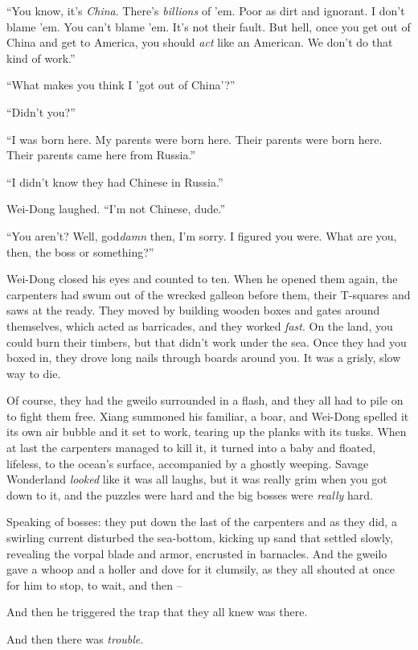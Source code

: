 ``You know, it's \emph{China}. There's \emph{billions} of 'em. Poor
as dirt and ignorant. I don't blame 'em. You can't blame 'em. It's
not their fault. But hell, once you get out of China and get to
America, you should \emph{act} like an American. We don't do that
kind of work.''

``What makes you think I 'got out of China'?''

``Didn't you?''

``I was born here. My parents were born here. Their parents were
born here. Their parents came here from Russia.''

``I didn't know they had Chinese in Russia.''

Wei-Dong laughed. ``I'm not Chinese, dude.''

``You aren't? Well, god\emph{damn} then, I'm sorry. I figured you
were. What are you, then, the boss or something?''

Wei-Dong closed his eyes and counted to ten. When he opened them
again, the carpenters had swum out of the wrecked galleon before
them, their T-squares and saws at the ready. They moved by building
wooden boxes and gates around themselves, which acted as
barricades, and they worked \emph{fast}. On the land, you could
burn their timbers, but that didn't work under the sea. Once they
had you boxed in, they drove long nails through boards around you.
It was a grisly, slow way to die.

Of course, they had the gweilo surrounded in a flash, and they all
had to pile on to fight them free. Xiang summoned his familiar, a
boar, and Wei-Dong spelled it its own air bubble and it set to
work, tearing up the planks with its tusks. When at last the
carpenters managed to kill it, it turned into a baby and floated,
lifeless, to the ocean's surface, accompanied by a ghostly weeping.
Savage Wonderland \emph{looked} like it was all laughs, but it was
really grim when you got down to it, and the puzzles were hard and
the big bosses were \emph{really} hard.

Speaking of bosses: they put down the last of the carpenters and as
they did, a swirling current disturbed the sea-bottom, kicking up
sand that settled slowly, revealing the vorpal blade and armor,
encrusted in barnacles. And the gweilo gave a whoop and a holler
and dove for it clumsily, as they all shouted at once for him to
stop, to wait, and then --

And then he triggered the trap that they all knew was there.

And then there was \emph{trouble.}

